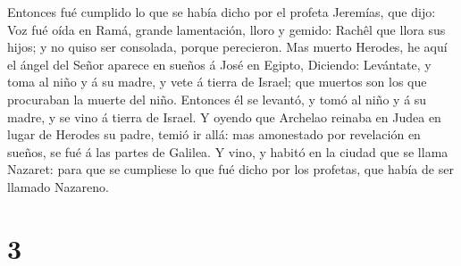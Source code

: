  Entonces fué cumplido lo que se había dicho por el profeta
Jeremías, que dijo:  Voz fué oída en Ramá, grande
lamentación, lloro y gemido: Rachêl que llora sus hijos; y no quiso ser
consolada, porque perecieron.  Mas muerto Herodes, he aquí
el ángel del Señor aparece en sueños á José en Egipto, 
Diciendo: Levántate, y toma al niño y á su madre, y vete á tierra de
Israel; que muertos son los que procuraban la muerte del niño.
 Entonces él se levantó, y tomó al niño y á su madre, y se
vino á tierra de Israel.  Y oyendo que Archelao reinaba en
Judea en lugar de Herodes su padre, temió ir allá: mas amonestado por
revelación en sueños, se fué á las partes de Galilea.  Y
vino, y habitó en la ciudad que se llama Nazaret: para que se cumpliese
lo que fué dicho por los profetas, que había de ser llamado Nazareno.

\hypertarget{section-2}{%
\section{3}\label{section-2}}

